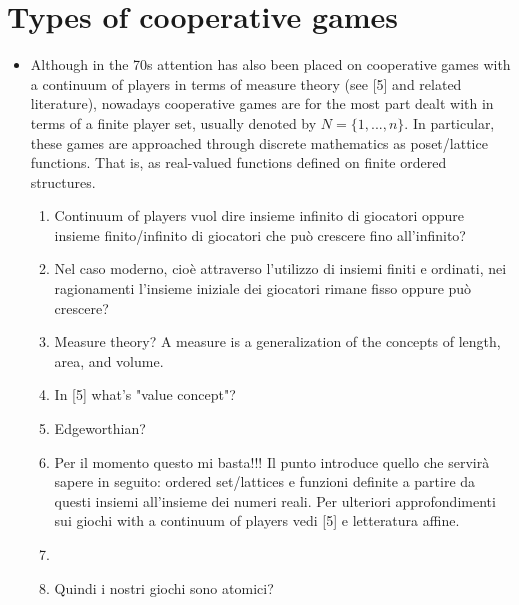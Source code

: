 \chapter{Types of cooperative games}
\begin{itemize}
	\item Although in the 70s attention has also been placed on cooperative games with a continuum of players in terms of measure theory (see [5] and related literature), nowadays cooperative games are for the most part dealt with in terms of a finite player set, usually denoted by $N = \{1,...,n\}$. In particular, these games are approached through discrete mathematics as poset/lattice functions. That is, as real-valued functions defined on finite ordered structures. \\
			\begin{enumerate}
					\item Continuum of players vuol dire insieme infinito di giocatori oppure insieme finito/infinito di giocatori che può crescere fino all'infinito? 
					\item Nel caso moderno, cio\`e attraverso l'utilizzo di insiemi finiti e ordinati, nei ragionamenti l'insieme iniziale dei giocatori rimane fisso oppure può crescere?
					\item Measure theory? A measure is a generalization of the concepts of length, area, and volume. 
					\item In [5] what's "value concept"?
					\item Edgeworthian? 
					\item Per il momento questo mi basta!!! Il punto introduce quello che servir\`a sapere in seguito: ordered set/lattices e funzioni definite a partire da questi insiemi all'insieme dei numeri reali. Per ulteriori approfondimenti sui giochi with a continuum of players vedi [5] e letteratura affine.
					\item {}
					\item Quindi i nostri giochi sono atomici?
			\end{enumerate}
	

\end{itemize}
